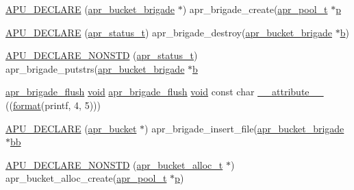 \begin{DoxyCompactItemize}
\item 
\hyperlink{group__APR__Util__Bucket__Brigades_gacf9eda09476ce80470514efcf6144692}{A\+P\+U\+\_\+\+D\+E\+C\+L\+A\+RE} (\hyperlink{structapr__bucket__brigade}{apr\+\_\+bucket\+\_\+brigade} $\ast$) apr\+\_\+brigade\+\_\+create(\hyperlink{structapr__pool__t}{apr\+\_\+pool\+\_\+t} $\ast$\hyperlink{group__APACHE__CORE__MPM_ga5cd91701e5c167f2b1a38e70ab57817e}{p}
\item 
\hyperlink{group__APR__Util__Bucket__Brigades_ga926dce3ea57b811f0833dd06f3d08426}{A\+P\+U\+\_\+\+D\+E\+C\+L\+A\+RE} (\hyperlink{group__apr__errno_gaa5105fa83cc322f09382292db8b47593}{apr\+\_\+status\+\_\+t}) apr\+\_\+brigade\+\_\+destroy(\hyperlink{structapr__bucket__brigade}{apr\+\_\+bucket\+\_\+brigade} $\ast$\hyperlink{group__APR__Util__Bucket__Brigades_ga11dc1bdeac74315dbed17465c98879e9}{b})
\item 
\hyperlink{group__APR__Util__Bucket__Brigades_ga2f52ba8a30c995de5999498c8314805f}{A\+P\+U\+\_\+\+D\+E\+C\+L\+A\+R\+E\+\_\+\+N\+O\+N\+S\+TD} (\hyperlink{group__apr__errno_gaa5105fa83cc322f09382292db8b47593}{apr\+\_\+status\+\_\+t}) apr\+\_\+brigade\+\_\+putstrs(\hyperlink{structapr__bucket__brigade}{apr\+\_\+bucket\+\_\+brigade} $\ast$\hyperlink{group__APR__Util__Bucket__Brigades_ga11dc1bdeac74315dbed17465c98879e9}{b}
\item 
\hyperlink{group__APR__Util__Bucket__Brigades_gafa0dbcd060e2e432406052e4d7c96204}{apr\+\_\+brigade\+\_\+flush} \hyperlink{group__MOD__ISAPI_gacd6cdbf73df3d9eed42fa493d9b621a6}{void} \hyperlink{group__APR__Util__Bucket__Brigades_gafa0dbcd060e2e432406052e4d7c96204}{apr\+\_\+brigade\+\_\+flush} \hyperlink{group__MOD__ISAPI_gacd6cdbf73df3d9eed42fa493d9b621a6}{void} const char \hyperlink{group__APR__Util__Bucket__Brigades_gaf569cf37370baf6204d60f34f2a7cb28}{\+\_\+\+\_\+attribute\+\_\+\+\_\+} ((\hyperlink{group__apr__time_ga6427c3237144d9709aa13825289f0b78}{format}(printf, 4, 5)))
\item 
\hyperlink{group__APR__Util__Bucket__Brigades_ga27f6e71b8633cd35233362c55205ae1d}{A\+P\+U\+\_\+\+D\+E\+C\+L\+A\+RE} (\hyperlink{structapr__bucket}{apr\+\_\+bucket} $\ast$) apr\+\_\+brigade\+\_\+insert\+\_\+file(\hyperlink{structapr__bucket__brigade}{apr\+\_\+bucket\+\_\+brigade} $\ast$\hyperlink{group__MOD__PROXY_ga9313a8a2814cff280d5d780c723def3c}{bb}
\item 
\hyperlink{group__APR__Util__Bucket__Brigades_ga555f01b5d309441a9d8a96e8dbaa470f}{A\+P\+U\+\_\+\+D\+E\+C\+L\+A\+R\+E\+\_\+\+N\+O\+N\+S\+TD} (\hyperlink{structapr__bucket__alloc__t}{apr\+\_\+bucket\+\_\+alloc\+\_\+t} $\ast$) apr\+\_\+bucket\+\_\+alloc\+\_\+create(\hyperlink{structapr__pool__t}{apr\+\_\+pool\+\_\+t} $\ast$\hyperlink{group__APACHE__CORE__MPM_ga5cd91701e5c167f2b1a38e70ab57817e}{p})

\end{DoxyCompactItemize}
